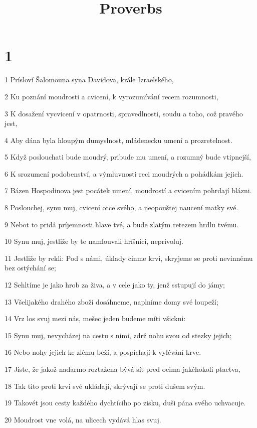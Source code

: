 

\title{Proverbs}

\chapter{1}

\par 1 Prísloví Šalomouna syna Davidova, krále Izraelského,
\par 2 Ku poznání moudrosti a cvicení, k vyrozumívání recem rozumnosti,
\par 3 K dosažení vycvicení v opatrnosti, spravedlnosti, soudu a toho, což pravého jest,
\par 4 Aby dána byla hloupým dumyslnost, mládenecku umení a prozretelnost.
\par 5 Když poslouchati bude moudrý, pribude mu umení, a rozumný bude vtipnejší,
\par 6 K srozumení podobenství, a výmluvnosti reci moudrých a pohádkám jejich.
\par 7 Bázen Hospodinova jest pocátek umení, moudrostí a cvicením pohrdají blázni.
\par 8 Poslouchej, synu muj, cvicení otce svého, a neopouštej naucení matky své.
\par 9 Nebot to pridá príjemnosti hlave tvé, a bude zlatým retezem hrdlu tvému.
\par 10 Synu muj, jestliže by te namlouvali hríšníci, neprivoluj.
\par 11 Jestliže by rekli: Pod s námi, úklady cinme krvi, skryjeme se proti nevinnému bez ostýchání se;
\par 12 Sehltíme je jako hrob za živa, a v cele jako ty, jenž sstupují do jámy;
\par 13 Všelijakého drahého zboží dosáhneme, naplníme domy své loupeží;
\par 14 Vrz los svuj mezi nás, mešec jeden budeme míti všickni:
\par 15 Synu muj, nevycházej na cestu s nimi, zdrž nohu svou od stezky jejich;
\par 16 Nebo nohy jejich ke zlému beží, a pospíchají k vylévání krve.
\par 17 Jiste, že jakož nadarmo roztažena bývá sít pred ocima jakéhokoli ptactva,
\par 18 Tak tito proti krvi své ukládají, skrývají se proti dušem svým.
\par 19 Takovét jsou cesty každého dychtícího po zisku, duši pána svého uchvacuje.
\par 20 Moudrost vne volá, na ulicech vydává hlas svuj.
